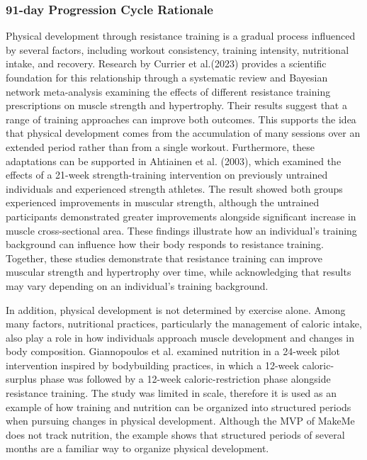\documentclass[11pt]{article}
\begin{document}
\subsubsection{91-day Progression Cycle Rationale}
\label{sec:cyclerationale}
Physical development through resistance training is a gradual process influenced by several factors, including workout
consistency, training intensity, nutritional intake, and recovery. Research by Currier et al.(2023) provides a scientific
foundation for this relationship through a systematic review and Bayesian network meta-analysis examining the effects
of different resistance training prescriptions on muscle strength and hypertrophy.\cite{currier2023resistance} Their results suggest that a range
of training approaches can improve both outcomes. This supports the idea that physical development comes from the accumulation
of many sessions over an extended period rather than from a single workout. Furthermore, these adaptations can be
supported in Ahtiainen et al. (2003), which examined the effects of a 21-week strength-training intervention on previously
untrained individuals and experienced strength athletes.\cite{ahtiainen2003muscle} The result showed both groups experienced improvements in muscular
strength, although the untrained participants demonstrated greater improvements alongside significant increase in muscle
cross-sectional area. These findings illustrate how an individual's training background can influence how their body
responds to resistance training. Together, these studies demonstrate that resistance training can improve muscular
strength and hypertrophy over time, while acknowledging that results may vary depending on an individual's training
background.

In addition, physical development is not determined by exercise alone. Among many factors, nutritional practices, particularly the management of
caloric intake, also play a role in how individuals approach muscle development and changes in body composition. Giannopoulos et al.
examined nutrition in a 24-week pilot intervention inspired by bodybuilding practices, in which a 12-week caloric-surplus
phase was followed by a 12-week caloric-restriction phase alongside resistance training.\cite{giannopoulos2025bulkcut} The study was limited in
scale, therefore it is used as an example of how training and nutrition can be organized into structured periods when
pursuing changes in physical development. Although the MVP of MakeMe does not track nutrition, the example shows that 
structured periods of several months are a familiar way to organize physical development.
\end{document}
